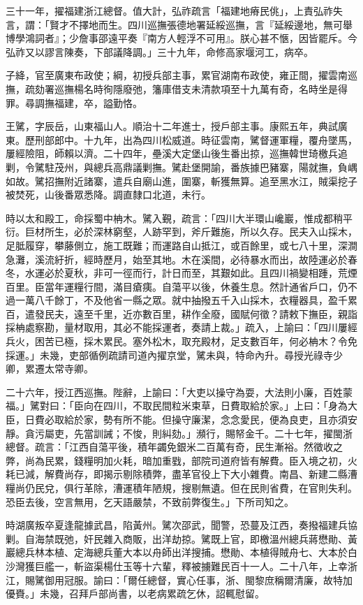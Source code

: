 \begin{pinyinscope}
三十一年，擢福建浙江總督。值大計，弘祚疏言「福建地瘠民佻」，上責弘祚失言，謂：「賢才不擇地而生。四川巡撫張德地署延綏巡撫，言『延綏邊地，無可舉博學鴻詞者』；少詹事邵遠平奏『南方人輕浮不可用』。朕心甚不愜，因皆罷斥。今弘祚又以謬言陳奏，下部議降調。」三十九年，命修高家堰河工，病卒。

子絳，官至廣東布政使；綱，初授兵部主事，累官湖南布政使，雍正間，擢雲南巡撫，疏劾署巡撫楊名時徇隱廢弛，籓庫借支未清款項至十九萬有奇，名時坐是得罪。尋調撫福建，卒，謚勤恪。

王騭，字辰岳，山東福山人。順治十二年進士，授戶部主事。康熙五年，典試廣東。歷刑部郎中。十九年，出為四川松威道。時征雲南，騭督運軍糧，覆舟墜馬，屢經險阻，師賴以濟。二十四年，壘溪大定堡山後生番出掠，巡撫韓世琦檄兵追剿，令騭駐茂州，與總兵高鼎議剿撫。騭赴堡開諭，番族據巴豬寨，陽就撫，負嵎如故。騭招撫附近諸寨，遣兵自廟山進，圍寨，斬獲無算。追至黑水江，賊渠挖子被焚死，山後番眾悉降。調直隸口北道，未行。

時以太和殿工，命採蜀中柟木。騭入覲，疏言：「四川大半環山巉巖，惟成都稍平衍。巨材所生，必於深林窮壑，人跡罕到，斧斤難施，所以久存。民夫入山採木，足胝履穿，攀藤側立，施工既難；而運路自山抵江，或百餘里，或七八十里，深澗急灘，溪流紆折，經時歷月，始至其地。木在溪間，必待暴水而出，故陸運必於春冬，水運必於夏秋，非可一徑而行，計日而至，其艱如此。且四川禍變相踵，荒煙百里。臣當年運糧行間，滿目瘡痍。自蕩平以後，休養生息。然計通省戶口，仍不過一萬八千餘丁，不及他省一縣之眾。就中抽撥五千入山採木，衣糧器具，盈千累百，遣發民夫，遠至千里，近亦數百里，耕作全廢，國賦何徵？請敕下撫臣，親詣採柟處察勘，量材取用，其必不能採運者，奏請上裁。」疏入，上諭曰：「四川屢經兵火，困苦已極，採木累民。塞外松木，取充殿材，足支數百年，何必柟木？令免採運。」未幾，吏部循例疏請司道內擢京堂，騭未與，特命內升。尋授光祿寺少卿，累遷太常寺卿。

二十六年，授江西巡撫。陛辭，上諭曰：「大吏以操守為耍，大法則小廉，百姓蒙福。」騭對曰：「臣向在四川，不取民間粒米束草，日費取給於家。」上曰：「身為大臣，日費必取給於家，勢有所不能。但操守廉潔，念念愛民，便為良吏，且亦須安靜。貪污屬吏，先當訓誡；不悛，則糾劾。」瀕行，賜帑金千。二十七年，擢閩浙總督。疏言：「江西自蕩平後，積年蠲免銀米二百萬有奇，民生漸裕。然徵收之弊，尚為民累，錢糧明加火耗，暗加重戥，部院司道府皆有解費。臣入境之初，火耗已減，解費尚存，即揭示剔除積弊，盡革官役上下大小雜費。南昌、新建二縣漕糧尚仍民兌，俱行革除，漕運積年陋規，搜剔無遺。但在民則省費，在官則失利。恐臣去後，空言無用，乞天語嚴禁，不致前弊復生。」下所司知之。

時湖廣叛卒夏逢龍據武昌，陷黃州。騭次邵武，聞警，恐蔓及江西，奏撥福建兵協剿。自海禁既弛，奸民雜入商販，出洋劫掠。騭既上官，即檄溫州總兵蔣懋勛、黃巖總兵林本植、定海總兵董大本以舟師出洋搜捕。懋勛、本植得賊舟七、大本於白沙灣獲巨艦一，斬盜渠楊仕玉等十六輩，釋被擄難民百十一人。二十八年，上幸浙江，賜騭御用冠服。諭曰：「爾任總督，實心任事，浙、閩黎庶稱爾清廉，故特加優賚。」未幾，召拜戶部尚書，以老病累疏乞休，詔輒慰留。


\end{pinyinscope}
